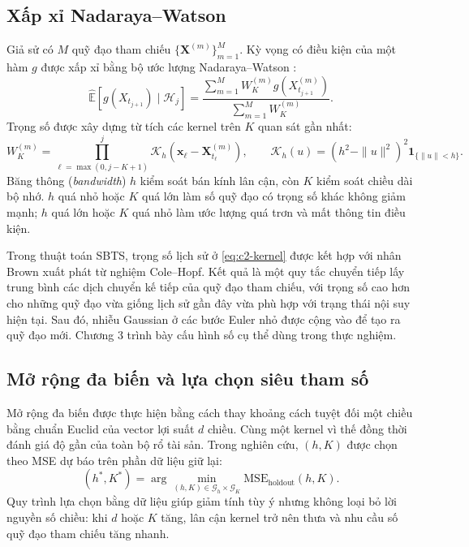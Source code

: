 \subsection{Xấp xỉ Nadaraya--Watson}

Giả sử có $M$ quỹ đạo tham chiếu
$\{\mathbf{X}^{(m)}\}_{m=1}^{M}$. Kỳ vọng có điều kiện của một hàm $g$ được
xấp xỉ bằng bộ ước lượng Nadaraya--Watson
\parencite{Nadaraya1964,Watson1964}:
\begin{equation}
    \widehat{\mathbb{E}}[g(X_{t_{j+1}})\mid\mathcal{H}_j]
    =\frac{\sum_{m=1}^{M}W_{K}^{(m)}
    g(X_{t_{j+1}}^{(m)})}
    {\sum_{m=1}^{M}W_{K}^{(m)}}.
    \label{eq:c2-nw}
\end{equation}
Trọng số được xây dựng từ tích các kernel trên $K$ quan sát gần nhất:
\begin{equation}
    W_{K}^{(m)}
    =\prod_{\ell=\max(0,j-K+1)}^{j}
    \mathcal{K}_{h}
    \left(\mathbf{x}_{\ell}-\mathbf{X}_{t_{\ell}}^{(m)}\right),
    \qquad
    \mathcal{K}_{h}(u)
    =(h^2-\|u\|^2)^2\mathbf{1}_{\{\|u\|<h\}}.
    \label{eq:c2-kernel}
\end{equation}
Băng thông (\textit{bandwidth}) $h$ kiểm soát bán kính lân cận, còn $K$ kiểm soát chiều dài bộ nhớ.
$h$ quá nhỏ hoặc $K$ quá lớn làm số quỹ đạo có trọng số khác không giảm mạnh;
$h$ quá lớn hoặc $K$ quá nhỏ làm ước lượng quá trơn và mất thông tin điều kiện.

Trong thuật toán SBTS, trọng số lịch sử ở \eqref{eq:c2-kernel} được kết hợp
với nhân Brown xuất phát từ nghiệm Cole--Hopf. Kết quả là một quy tắc chuyển
tiếp lấy trung bình các dịch chuyển kế tiếp của quỹ đạo tham chiếu, với trọng
số cao hơn cho những quỹ đạo vừa giống lịch sử gần đây vừa phù hợp với trạng
thái nội suy hiện tại. Sau đó, nhiễu Gaussian ở các bước Euler nhỏ được cộng
vào để tạo ra quỹ đạo mới. Chương 3 trình bày cấu hình số cụ thể dùng trong
thực nghiệm.

\subsection{Mở rộng đa biến và lựa chọn siêu tham số}

Mở rộng đa biến được thực hiện bằng cách thay khoảng cách tuyệt đối một chiều
bằng chuẩn Euclid của vector lợi suất $d$ chiều. Cùng một kernel vì thế đồng
thời đánh giá độ gần của toàn bộ rổ tài sản. Trong nghiên cứu, $(h,K)$ được
chọn theo MSE dự báo trên phần dữ liệu giữ lại:
\begin{equation}
    (h^{*},K^{*})
    =\arg\min_{(h,K)\in\mathcal{G}_{h}\times\mathcal{G}_{K}}
      \mathrm{MSE}_{\mathrm{holdout}}(h,K).
    \label{eq:c2-hk-selection}
\end{equation}
Quy trình lựa chọn bằng dữ liệu giúp giảm tính tùy ý nhưng không loại bỏ lời
nguyền số chiều: khi $d$ hoặc $K$ tăng, lân cận kernel trở nên thưa và nhu cầu
số quỹ đạo tham chiếu tăng nhanh.

